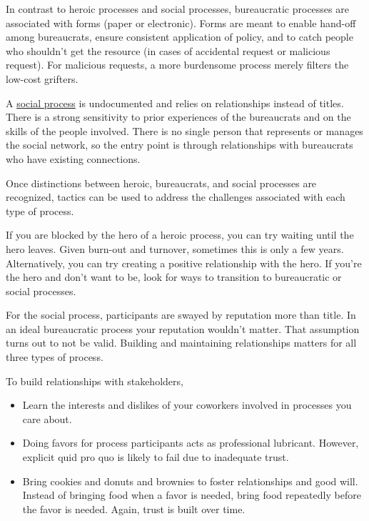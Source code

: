 In contrast to heroic processes and social processes, bureaucratic processes are associated with forms (paper or electronic). Forms are meant to enable hand-off among bureaucrats, ensure consistent application of policy, and to catch people who shouldn't get the resource (in cases of accidental request or malicious request). For malicious requests, a more burdensome process merely filters the low-cost grifters. 

A \underline{social process} is undocumented and relies on relationships instead of titles. There is a strong sensitivity to prior experiences of the bureaucrats and on the skills of the people involved. There is no single person that represents or manages the social network, so the entry point is through relationships with bureaucrats who have existing connections.

Once distinctions between heroic, bureaucrats, and social processes are recognized, tactics can be used to address the challenges associated with each type of process.

If you are blocked by the hero of a heroic process, you can try waiting until the hero leaves. Given burn-out and turnover, sometimes this is only a few years. Alternatively, you can try creating a positive relationship with the hero.  If you're the hero and don't want to be, look for ways to transition to bureaucratic or social processes. 


For the social process, participants are swayed by reputation more than title. In an ideal bureaucratic process your reputation wouldn't matter. That assumption turns out to not be valid. Building and maintaining relationships matters for all three types of process.

To build relationships with stakeholders,
\begin{itemize}
    \item Learn the interests and dislikes of your coworkers involved in processes you care about.
    \item Doing favors for process participants acts as professional lubricant. However, explicit quid pro quo is likely to fail due to inadequate trust. 
    \item Bring cookies and donuts and brownies to foster relationships and good will. 
%
%
Instead of bringing food when a favor is needed, bring food repeatedly before the favor is needed. Again, trust is built over time. 
\end{itemize}


